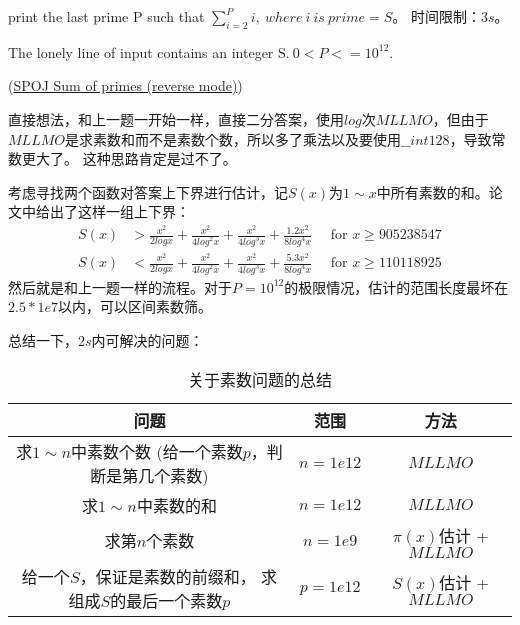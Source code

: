 \vbox{}






\begin{example}
	print the last prime P such that $\sum_{i=2}^Pi,\ where\ i \ is\ prime = S$。 时间限制：$3s$。
	
	The lonely line of input contains an integer S.$\ 0 < P <= 10^{12}$.
	
	(\href{https://www.spoj.com/problems/SUMPRIM2/}{SPOJ Sum of primes (reverse mode)})
\end{example}
\begin{solution}
	直接想法，和上一题一开始一样，直接二分答案，使用$log$次$MLLMO$，但由于$MLLMO$是求素数和而不是素数个数，所以多了乘法以及要使用$\_\_int128$，导致常数更大了。
	这种思路肯定是过不了。
	
	考虑寻找两个函数对答案上下界进行估计，记$S(x)$为$1\sim x$中所有素数的和。论文\cite{Axler2014On}中给出了这样一组上下界：
	$$
	\begin{aligned} S(x) & > \frac{x^2}{2logx} + \frac{x^2}{4log^2x} + \frac{x^2}{4log^3x} + \frac{1.2x^2}{8log^4x} \quad \text { for } x \geqslant 905238547 \\ S(x) & < \frac{x^2}{2logx} + \frac{x^2}{4log^2x} + \frac{x^2}{4log^3x} + \frac{5.3x^2}{8log^4x} \quad \text { for } x \geqslant 110118925 \end{aligned}
	$$
	然后就是和上一题一样的流程。对于$P=10^{12}$的极限情况，估计的范围长度最坏在$2.5*1e7$以内，可以区间素数筛。
	
\end{solution}



\vbox{}

\begin{note}
	总结一下，$2s$内可解决的问题：
		\begin{table}[!htbp]
			\centering
			\caption{关于素数问题的总结 \label{tab:summaryforprime}}
			\begin{spacing}{1}
				\begin{tabular}{|c|c|c|}
					\toprule[1pt]
					问题 & 范围 & 方法 \\
					\midrule[1.5pt]
					\tabincell{c}{求$1\sim n$中素数个数 \\ (给一个素数$p$，判断是第几个素数)} &   $n= 1e12$ &  $MLLMO$ \\
					\midrule[1pt]
					求$1\sim n$中素数的和 &  $n=1e12$ & $MLLMO$  \\
					\midrule[1pt]
					求第$n$个素数  &  $n=1e9 $ &  $\pi(x)$估计 + $MLLMO$ \\
					\midrule[1pt]
					\tabincell{c}{给一个$S$，保证是素数的前缀和， \\ 求组成$S$的最后一个素数$p$}  &   $p=1e12$ &  $S(x)$估计 + $MLLMO$ \\
					\bottomrule[1pt]
				\end{tabular}%
			\end{spacing}
		\end{table}%
\end{note}

